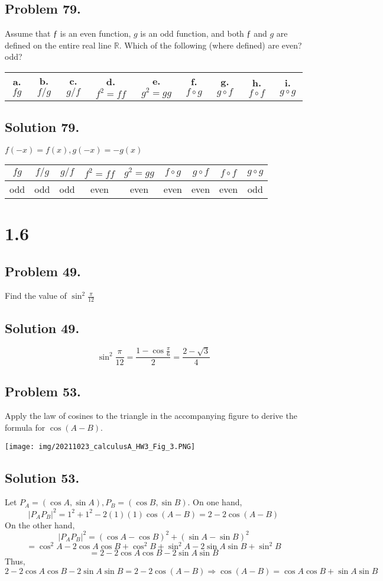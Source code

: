 \documentclass{article}
\begin{document}
\subsection* {Problem 79.}
Assume that $ƒ$ is an even function, $g$ is an odd function, and both $ƒ$ and $g$ are defined on the entire real line $\mathbb{R}$. Which of the following (where defined) are even? odd?\newline
\begin{tabular}{ccccccccc}
\textbf{a.}$fg$&\textbf{b.}$f/g$&\textbf{c.}$g/f$&
\textbf{d.}$f^2=ff$&\textbf{e.}$g^2=gg$&\textbf{f.}$f\circ g$&
\textbf{g.}$g\circ f$&\textbf{h.}$f\circ f$&\textbf{i.}$g\circ g$
\end{tabular}
\subsection*{Solution 79.}
$f(-x)=f(x),g(-x)=-g(x)$\newline
\begin{tabular}{|c|c|c|c|c|c|c|c|c|}
\hline
$fg$&$f/g$&$g/f$&$f^2=ff$&$g^2=gg$&$f\circ g$&$g\circ f$&$f\circ f$&$g\circ g$\\
\hline
odd&odd&odd&even&even&even&even&even&odd\\
\hline
\end{tabular}
\section*{1.6}
\subsection* {Problem 49.}
Find the value of $\sin^2{\frac{\pi}{12}}$
\subsection*{Solution 49.}
\[\sin^2{\frac{\pi}{12}}=\frac{1-\cos{\frac{\pi}{6}}}{2}=\frac{2-\sqrt{3}}{4}\]
\subsection* {Problem 53.}
Apply the law of cosines to the triangle in the accompanying figure to derive the formula for $\cos{(A-B)}$.
\begin{center}
    \texttt{[image: img/20211023\_calculusA\_HW3\_Fig\_3.PNG]}
\end{center}
\subsection*{Solution 53.}
Let $P_A=(\cos{A},\sin{A}),P_B=(\cos{B},\sin{B})$.\newline
On one hand,
\[|P_AP_B|^2=1^2+1^2-2(1)(1)\cos{(A-B)}=2-2\cos{(A-B)}\]
On the other hand,
\[|P_AP_B|^2=(\cos{A}-\cos{B})^2+(\sin{A}-\sin{B})^2\]
\[=\cos^2A-2\cos{A}\cos{B}+\cos^2B+\sin^2A-2\sin{A}\sin{B}+\sin^2B\]
\[=2-2\cos{A}\cos{B}-2\sin{A}\sin{B}\]
Thus,
\[2-2\cos{A}\cos{B}-2\sin{A}\sin{B}=2-2\cos{(A-B)}\Rightarrow \cos{(A-B)}=\cos{A}\cos{B}+\sin{A}\sin{B}\]
\end{document}
